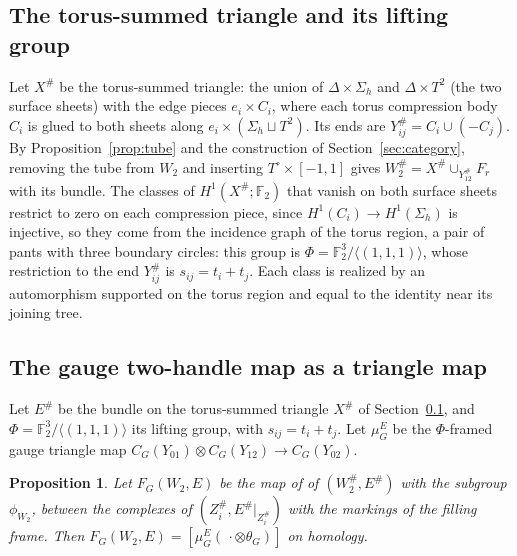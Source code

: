 \documentclass[11pt]{amsart}
\newtheorem{proposition}[theorem]{Proposition}
\theoremstyle{definition}
\theoremstyle{remark}
\theoremstyle{plain}
\numberwithin{equation}{section}
\newcommand{\FF}{\mathbb{F}_2}
\begin{document}
\subsection{The torus-summed triangle and its lifting group}\label{subsec:torus-summed-triangle}

Let $X^\#$ be the torus-summed triangle: the union of $\Delta\times\Sigma_h$ and
$\Delta\times T^2$ (the two surface sheets) with the edge pieces
$e_i\times C_i$, where each torus compression body $C_i$ is glued to both
sheets along $e_i\times(\Sigma_h\sqcup T^2)$. Its ends are $Y_{ij}^\#=C_i\cup
(-C_j)$. By Proposition~\ref{prop:tube} and the construction of
Section~\ref{sec:category}, removing the tube from $W_2$ and inserting
$T^\circ\times[-1,1]$ gives $W_2^\#=X^\#\cup_{Y_{12}^\#}F_r$ with its bundle. The
classes of $H^1(X^\#;\FF)$ that vanish on both surface sheets restrict to zero
on each compression piece, since $H^1(C_i)\to H^1(\Sigma_h)$ is injective, so
they come from the incidence graph of the torus region, a pair of pants with
three boundary circles: this group is $\Phi=\FF^3/\langle(1,1,1)\rangle$, whose
restriction to the end $Y_{ij}^\#$ is $s_{ij}=t_i+t_j$. Each class is realized by
an automorphism supported on the torus region and equal to the identity near
its joining tree.

\subsection{The gauge two-handle map as a triangle map}

Let $E^\#$ be the bundle on the torus-summed triangle $X^\#$ of
Section~\ref{subsec:torus-summed-triangle}, and
$\Phi=\FF^3/\langle(1,1,1)\rangle$ its lifting group, with $s_{ij}=t_i+t_j$. Let $\mu_G^E$ be the $\Phi$-framed gauge
triangle map $C_G(Y_{01})\otimes C_G(Y_{12})\to C_G(Y_{02})$.

\begin{proposition}\label{prop:gauge-triangle}
Let $F_G(W_2,E)$ be the map of \cite[Section~5]{KM-unknot} of
$(W_2^\#,E^\#)$ with the subgroup $\phi_{W_2}$, between the complexes of
$(Z_i^\#,E^\#|_{Z_i^\#})$ with the markings of the filling frame. Then
$F_G(W_2,E)=[\mu_G^E(\,\cdot\otimes\theta_G)]$ on homology.
\end{proposition}
\end{document}

